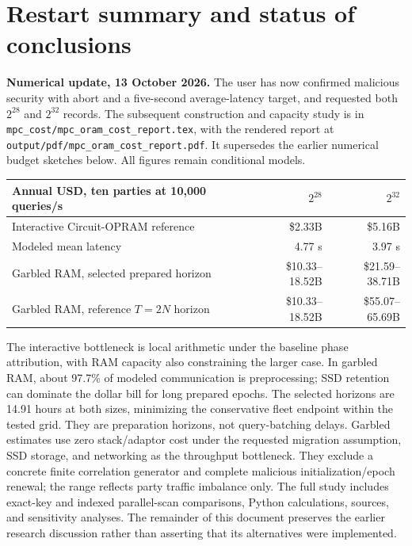 \documentclass[11pt]{article}
\begin{document}
\hypersetup{pageanchor=true}
\tableofcontents
\clearpage
{}

\section{Restart summary and status of conclusions}\label{sec:restart}

\textbf{Numerical update, 13 October 2026.} The user has now confirmed malicious
security with abort and a five-second average-latency target, and requested both
$2^{28}$ and $2^{32}$ records. The subsequent construction and capacity study is
in \texttt{mpc\_cost/mpc\_oram\_cost\_report.tex}, with the rendered report at
\texttt{output/pdf/mpc\_oram\_cost\_report.pdf}. It supersedes the earlier
numerical budget sketches below. All figures remain conditional models.
\begin{center}\small
\begin{tabular}{lrr}\toprule
Annual USD, ten parties at 10,000 queries/s & $2^{28}$ & $2^{32}$\\\midrule
Interactive Circuit-OPRAM reference & \$2.33B & \$5.16B\\
Modeled mean latency & 4.77 s & 3.97 s\\
Garbled RAM, selected prepared horizon & \$10.33--18.52B & \$21.59--38.71B\\
Garbled RAM, reference $T=2N$ horizon & \$10.33--18.52B & \$55.07--65.69B\\
\bottomrule\end{tabular}
\end{center}
The interactive bottleneck is local arithmetic under the baseline phase
attribution, with RAM capacity also constraining the larger case. In garbled RAM,
about 97.7\% of modeled communication is preprocessing; SSD retention can dominate
the dollar bill for long prepared epochs. The selected horizons are 14.91 hours
at both sizes, minimizing the conservative fleet endpoint within the tested grid.
They are preparation horizons, not query-batching delays. Garbled estimates use
zero stack/adaptor cost under the requested migration assumption, SSD storage,
and networking as the throughput bottleneck. They exclude a concrete finite
correlation generator and complete malicious initialization/epoch renewal; the
range reflects party traffic imbalance only. The full study includes exact-key
and indexed parallel-scan comparisons, Python calculations, sources, and
sensitivity analyses. The remainder of this document preserves the earlier
research discussion rather than asserting that its alternatives were implemented.
\end{document}
